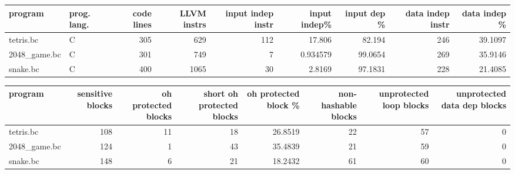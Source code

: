 \documentclass{article}
\begin{document}
\begin{table}[ht]
\centering
\begin{adjustbox}{width=1.3\textwidth}
\begin{tabular}{llrrrrrrr}
\hline
 program      & prog. lang.   &   code lines &   LLVM instrs &   input indep instr &   input indep\% &   input dep \% &   data indep instr &   data indep \% \\
\hline
 tetris.bc    & C             &          305 &           629 &                 112 &      17.806    &       82.194  &                246 &        39.1097 \\
 2048\_game.bc & C             &          301 &           749 &                   7 &       0.934579 &       99.0654 &                269 &        35.9146 \\
 snake.bc     & C             &          400 &          1065 &                  30 &       2.8169   &       97.1831 &                228 &        21.4085 \\
\hline
\end{tabular}

\end{adjustbox}
\end{table}

\begin{table}[ht]
\centering
\begin{adjustbox}{width=1.3\textwidth}
\begin{tabular}{lrrrrrrr}
\hline
 program      &   sensitive blocks &   oh protected blocks &   short oh protected blocks &   oh protected block \% &   non-hashable blocks &   unprotected loop blocks &   unprotected data dep blocks \\
\hline
 tetris.bc    &                108 &                    11 &                          18 &                26.8519 &                    22 &                        57 &                             0 \\
 2048\_game.bc &                124 &                     1 &                          43 &                35.4839 &                    21 &                        59 &                             0 \\
 snake.bc     &                148 &                     6 &                          21 &                18.2432 &                    61 &                        60 &                             0 \\
\hline
\end{tabular}

\end{adjustbox}
\end{table}
\end{document}
